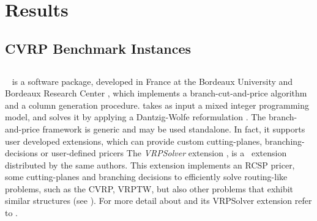 \chapter{Results}
\label{sec:results}

\section{CVRP Benchmark Instances}
\label{sec:results-benchmark-instances}





\begin{comment}
\cite{uchoa2017}
THE CVRPLIB website
The typical instance repository of today is a web page that allows downloading the instance
files and includes additional textual information, like file format description, instance
source, best known/optimal solution values, etc. The CVRLIB web page, where the new
instances (and all the previous CVRP instances described in Section 2) are available
(http://vrp.galgos.inf.puc-rio.br/index.php/en/), is more sophisticated:
\end{comment}


\section{\bapcod}
\label{sec:results-bapcod}

\textit{\bapcod}\ \parencite{sadykov2021} is a software package,
developed in France at the Bordeaux University and Bordeaux Research Center ,
which implements a branch-cut-and-price algorithm
and a column generation procedure.
\bapcod takes as input a mixed integer programming model, and solves it by applying
a Dantzig-Wolfe reformulation \parencite{dantzig1960}.
The branch-and-price framework is generic and may be used standalone.
In fact, it supports user developed extensions,
which can provide custom cutting-planes, branching-decisions
or user-defined pricers
The \textit{VRPSolver} extension \parencite{pessoa2020a}, is
a \bapcod\ extension distributed by the same authors.
This extension implements an RCSP pricer, some cutting-planes
and branching decisions to efficiently solve routing-like problems,
such as the CVRP, VRPTW, but also other problems that exhibit similar
structures (see \cite{pessoa2020a}).
For more detail about \bapcod and its VRPSolver extension refer to
\textcite{sadykov2021}.

